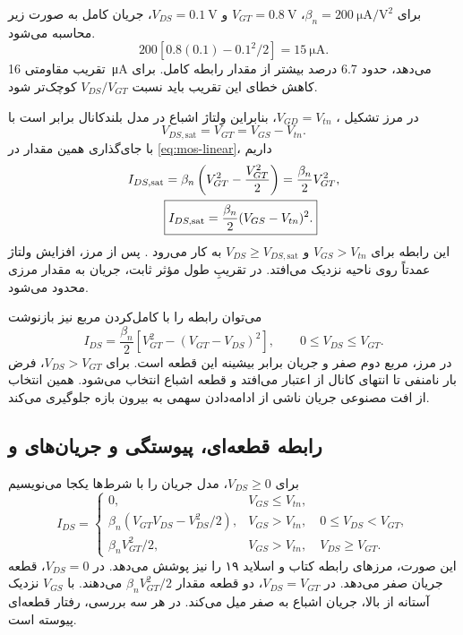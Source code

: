 برای \(\beta_n=\qty{200}{\micro\ampere\per\volt\squared}\)،
\(V_{GT}=\qty{0.8}{\volt}\) و \(V_{DS}=\qty{0.1}{\volt}\)، جریان کامل
به صورت زیر محاسبه می‌شود.
\[
 200[0.8(0.1)-0.1^2/2]=\qty{15}{\micro\ampere}.
\]
تقریب مقاومتی \qty{16}{\micro\ampere} می‌دهد، حدود \num{6.7} درصد بیشتر از مقدار
رابطه کامل. برای کاهش خطای این تقریب باید نسبت \(V_{DS}/V_{GT}\) کوچک‌تر شود.

در مرز تشکیل ، \(V_{GD}=V_{tn}\)، بنابراین ولتاژ اشباع در مدل
بلندکانال برابر است با
\begin{equation}
 V_{DS,\mathrm{sat}}=V_{GT}=V_{GS}-V_{tn}.
 \label{eq:mos-vdsat}
\end{equation}
با جای‌گذاری همین مقدار در \eqref{eq:mos-linear}، داریم
\begin{align}
 I_{DS,\mathrm{sat}}
 &=\beta_n\left(V_{GT}^2-\frac{V_{GT}^2}{2}\right)
 =\frac{\beta_n}{2}V_{GT}^2,\notag\\
 &\boxed{I_{DS,\mathrm{sat}}=\frac{\beta_n}{2}(V_{GS}-V_{tn})^2.}
 \label{eq:mos-saturation}
\end{align}
این رابطه برای \(V_{GS}>V_{tn}\) و \(V_{DS}\ge V_{DS,\mathrm{sat}}\) به کار
می‌رود \cite[رابطه  و اسلاید ۱۸]{weste,mos}.
پس از مرز، افزایش ولتاژ  عمدتاً روی ناحیه نزدیک  می‌افتد.
در تقریبِ طول مؤثر ثابت، جریان به مقدار مرزی محدود می‌شود.

می‌توان رابطه  را با کامل‌کردن مربع نیز بازنوشت
\begin{equation}
 I_{DS}=\frac{\beta_n}{2}
 \left[V_{GT}^2-(V_{GT}-V_{DS})^2\right],\qquad 0\le V_{DS}\le V_{GT}.
 \label{eq:mos-complete-square}
\end{equation}
در مرز، مربع دوم صفر و جریان برابر بیشینه این قطعه است.
برای \(V_{DS}>V_{GT}\)، فرض بار نامنفی تا انتهای کانال از اعتبار می‌افتد و
قطعه اشباع انتخاب می‌شود. همین انتخاب از افت مصنوعی جریان ناشی از ادامه‌دادن
سهمی به بیرون بازه جلوگیری می‌کند.

\subsection{رابطه قطعه‌ای، پیوستگی و جریان‌های  و }
برای \(V_{DS}\ge0\)، مدل جریان را با شرط‌ها یکجا می‌نویسیم
\begin{equation}
 I_{DS}=\begin{cases}
 0,&V_{GS}\le V_{tn},\\[2pt]
 \beta_n(V_{GT}V_{DS}-V_{DS}^2/2),
 &V_{GS}>V_{tn},\quad 0\le V_{DS}<V_{GT},\\[2pt]
 \beta_n V_{GT}^2/2,
 &V_{GS}>V_{tn},\quad V_{DS}\ge V_{GT}.
 \end{cases}
 \label{eq:mos-piecewise}
\end{equation}
این صورت، مرزهای رابطه  کتاب و اسلاید ۱۹ را نیز پوشش می‌دهد.
در \(V_{DS}=0\)، قطعه  جریان صفر می‌دهد. در
\(V_{DS}=V_{GT}\)، دو قطعه مقدار \(\beta_n V_{GT}^2/2\) می‌دهند.
با \(V_{GS}\) نزدیک آستانه از بالا، جریان اشباع به صفر میل می‌کند.
در هر سه بررسی، رفتار قطعه‌ای پیوسته است.

